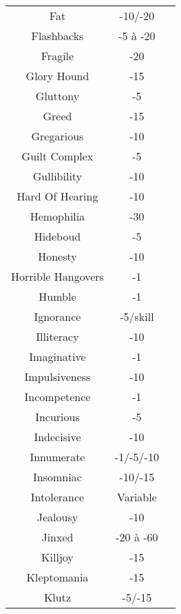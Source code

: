 \begin{center}
\begin{supertabular}{|c|c|c|}
Fat & -10/-20 & \cite[28]{B} \\
Flashbacks & -5 à -20 & \cite[90]{CI} \\
Fragile & -20 & \cite[102]{CI} \\
Glory Hound & -15 & \cite[90]{CI} \\
Gluttony & -5 & \cite[33]{B} \\
Greed & -15 & \cite[33]{B} \\
Gregarious & -10 & \cite[90]{CI} \\
Guilt Complex & -5 & \cite[90]{CI} \\
Gullibility & -10 & \cite[33]{B} \\
Hard Of Hearing & -10 & \cite[28]{B} \\
Hemophilia & -30 & \cite[28]{B} \\
Hideboud & -5 & \cite[91]{CI} \\
Honesty & -10 & \cite[33]{B} \\
Horrible Hangovers & -1 & \cite[79]{CI} \\
Humble & -1 & \cite[91]{CI} \\
Ignorance & -5/skill & \cite[78]{CI} \\
Illiteracy & -10 & \cite[33]{B} \\
Imaginative & -1 & \cite[91]{CI} \\
Impulsiveness & -10 & \cite[33]{B} \\
Incompetence & -1 & \cite[91]{CI} \\
Incurious & -5 & \cite[91]{CI} \\
Indecisive & -10 & \cite[91]{CI} \\
Innumerate & -1/-5/-10 & \cite[91]{CI} \\
Insomniac & -10/-15 & \cite[82]{CI} \\
Intolerance & Variable & \cite[34]{B} \\
Jealousy & -10 & \cite[34]{B} \\
Jinxed & -20 à -60 & \cite[102]{CI} \\
Killjoy & -15 & \cite[91]{CI} \\
Kleptomania & -15 & \cite[34]{B} \\
Klutz & -5/-15 & \cite[82]{CI} \\

\end{supertabular}
\end{center}
